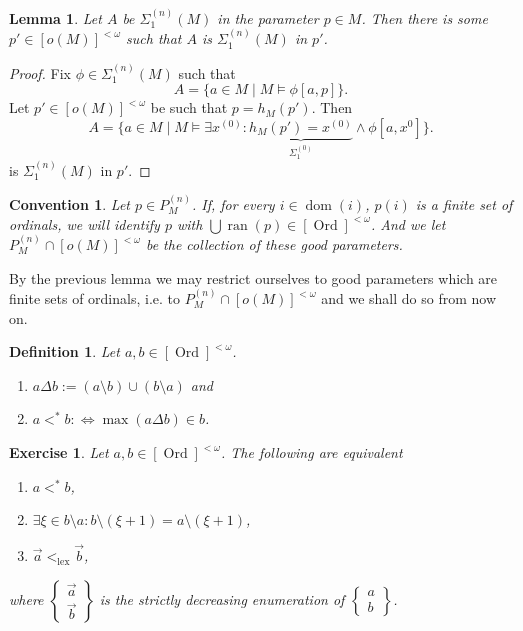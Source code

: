 \documentclass[12pt,a4paper]{article}
\theoremstyle{nicestyle}
\newtheorem{exercise}{Exercise}[subsection]
\newtheorem{definition}{Definition}[subsection]
\newtheorem{lemma}{Lemma}[subsection]
\newtheorem{convention}{Convention}[subsection]
\DeclareMathOperator{\dom}{dom}
\DeclareMathOperator{\ran}{ran}
\DeclareMathOperator{\ord}{Ord}
\DeclareMathOperator{\lex}{lex}
\begin{document}
\begin{lemma}
  Let $A$ be $\Sigma^{(n)}_1(M)$ in the parameter $p \in M$. Then
  there is some $p' \in [o(M)]^{<\omega}$ such that $A$ is
  $\Sigma^{(n)}_{1}(M)$ in $p'$.
\end{lemma}

\begin{proof}
  Fix $\phi \in \Sigma^{(n)}_{1}(M)$ such that
  \[
    A = \{ a \in M \mid M \models \phi[a,p] \}.
  \]
  Let $p' \in [o(M)]^{< \omega}$ be such that $p = h_{M}(p')$. Then
  \[
    A = \{ a \in M \mid M \models \exists x^{(0)} \colon
    \underbrace{h_{M}(p') = x^{(0)}}_{\Sigma^{(0)}_{1}} \wedge \phi[a,
    x^{0}] \}.
  \]
  is $\Sigma^{(n)}_{1}(M)$ in $p'$.
\end{proof}

\begin{convention}
  Let $p \in P^{(n)}_{M}$. If, for every $i \in \dom(i)$, $p(i)$ is a
  finite set of ordinals, we will identify $p$ with
  $\bigcup \ran(p) \in [\ord]^{<\omega}$. And we let
  $P^{(n)}_{M} \cap [o(M)]^{<\omega}$ be the collection of these
  good parameters.
\end{convention}
  
By the previous lemma we may restrict ourselves to good parameters
which are finite sets of ordinals, i.e. to
$P^{(n)}_{M} \cap [o(M)]^{<\omega}$ and we shall do so from now on.

\begin{definition}
  Let $a,b \in [\ord]^{<\omega}$.
  \begin{enumerate}
  \item $a \Delta b := (a \setminus b) \cup (b \setminus a)$ and
  \item $a <^{*}b : \iff \max(a \Delta b) \in b$.
  \end{enumerate}
\end{definition}

\begin{exercise}
  Let $a,b \in [\ord]^{<\omega}$. The following are equivalent

  \begin{enumerate}
  \item $a <^{*} b$,
  \item
    $\exists \xi \in b \setminus a \colon b \setminus (\xi + 1) = a
    \setminus (\xi + 1)$,
    \item $\vec{a} <_{\lex} \vec{b}$,
    \end{enumerate}
    where
    $\begin{Bmatrix}
      \vec{a} \\
      \vec{b}
    \end{Bmatrix}$
    is the strictly decreasing enumeration
    of $\begin{Bmatrix}
      a \\
      b
    \end{Bmatrix}$.
  \end{exercise}
\end{document}
